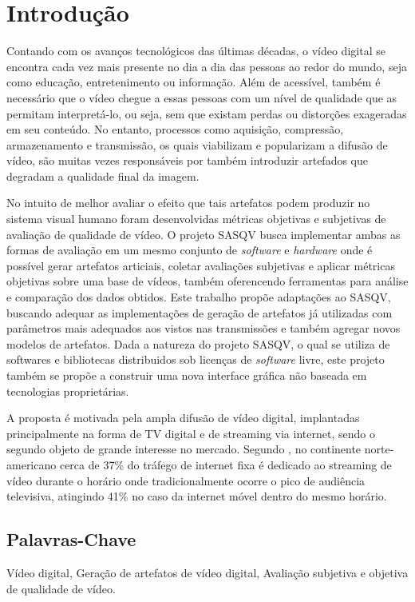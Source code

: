 \chapter{Introdução}

Contando com os avanços tecnológicos das últimas décadas, o vídeo digital se encontra cada vez mais presente no dia a dia das pessoas ao redor do mundo, seja como educação, entretenimento ou informação.
Além de acessível, também é necessário que o vídeo chegue a essas pessoas com um nível de qualidade que as permitam interpretá-lo, ou seja, sem que existam perdas ou distorções exageradas em seu conteúdo.
No entanto, processos como aquisição, compressão, armazenamento e transmissão, os quais viabilizam e popularizam a difusão de vídeo, são muitas vezes responsáveis por também introduzir artefados que degradam a qualidade final da imagem\cite{daronco}.

No intuito de melhor avaliar o efeito que tais artefatos podem produzir no sistema visual humano foram desenvolvidas métricas objetivas e subjetivas de avaliação de qualidade de vídeo. O projeto SASQV busca implementar ambas as formas de avaliação em um mesmo conjunto de \emph{software} e \emph{hardware} onde é possível gerar artefatos articiais, coletar avaliações subjetivas e aplicar métricas objetivas sobre uma base de vídeos, também oferencendo ferramentas para análise e comparação dos dados obtidos. Este trabalho propõe adaptações ao SASQV, buscando adequar as implementações de geração de artefatos já utilizadas com parâmetros mais adequados aos vistos nas transmissões e também agregar novos modelos de artefatos. Dada a natureza do projeto SASQV, o qual se utiliza de softwares e bibliotecas distribuidos sob licenças de \emph{software} livre, este projeto também se propõe a construir uma nova interface gráfica não baseada em tecnologias proprietárias.

A proposta é motivada pela ampla difusão de vídeo digital, implantadas principalmente na forma de TV digital e de streaming via internet, sendo o segundo objeto de grande interesse no mercado. Segundo \cite{sandvinereport}, no continente norte-americano cerca de 37\% do tráfego de internet fixa é dedicado ao streaming de vídeo durante o horário onde tradicionalmente ocorre o pico de audiência televisiva, atingindo 41\% no caso da internet móvel dentro do mesmo horário.

\section{Palavras-Chave}
Vídeo digital, Geração de artefatos de vídeo digital, Avaliação subjetiva e objetiva de qualidade de vídeo.
